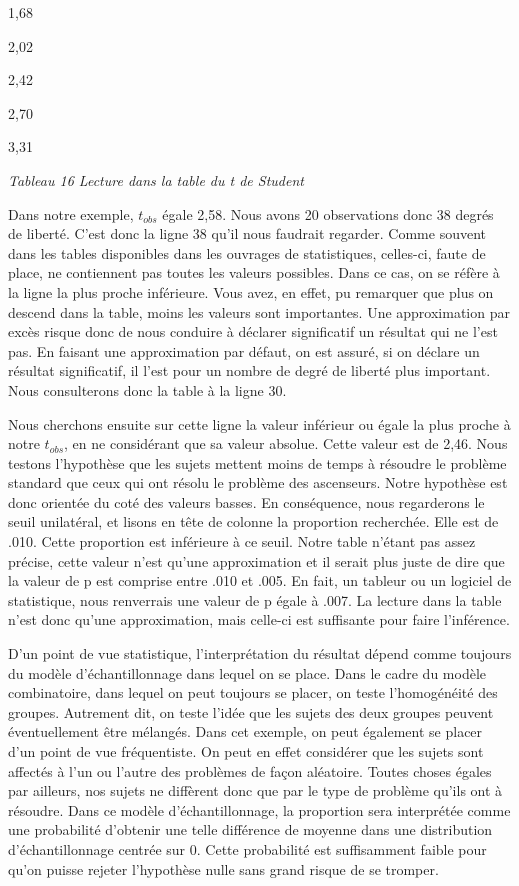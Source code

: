 \documentclass[]{book}
\theoremstyle{definition}
\theoremstyle{definition}
\theoremstyle{definition}
\theoremstyle{remark}
\begin{document}
1,68

2,02

2,42

2,70

3,31

\emph{Tableau 16 Lecture dans la table du t de Student}

Dans notre exemple, \(t_{obs}\) égale 2,58. Nous avons 20 observations
donc 38 degrés de liberté. C'est donc la ligne 38 qu'il nous faudrait
regarder. Comme souvent dans les tables disponibles dans les ouvrages de
statistiques, celles-ci, faute de place, ne contiennent pas toutes les
valeurs possibles. Dans ce cas, on se réfère à la ligne la plus proche
inférieure. Vous avez, en effet, pu remarquer que plus on descend dans
la table, moins les valeurs sont importantes. Une approximation par
excès risque donc de nous conduire à déclarer significatif un résultat
qui ne l'est pas. En faisant une approximation par défaut, on est
assuré, si on déclare un résultat significatif, il l'est pour un nombre
de degré de liberté plus important. Nous consulterons donc la table à la
ligne 30.

Nous cherchons ensuite sur cette ligne la valeur inférieur ou égale la
plus proche à notre \(t_{obs}\), en ne considérant que sa valeur
absolue. Cette valeur est de 2,46. Nous testons l'hypothèse que les
sujets mettent moins de temps à résoudre le problème standard que ceux
qui ont résolu le problème des ascenseurs. Notre hypothèse est donc
orientée du coté des valeurs basses. En conséquence, nous regarderons le
seuil unilatéral, et lisons en tête de colonne la proportion recherchée.
Elle est de .010. Cette proportion est inférieure à ce seuil. Notre
table n'étant pas assez précise, cette valeur n'est qu'une approximation
et il serait plus juste de dire que la valeur de p est comprise entre
.010 et .005. En fait, un tableur ou un logiciel de statistique, nous
renverrais une valeur de p égale à .007. La lecture dans la table n'est
donc qu'une approximation, mais celle-ci est suffisante pour faire
l'inférence.

D'un point de vue statistique, l'interprétation du résultat dépend comme
toujours du modèle d'échantillonnage dans lequel on se place. Dans le
cadre du modèle combinatoire, dans lequel on peut toujours se placer, on
teste l'homogénéité des groupes. Autrement dit, on teste l'idée que les
sujets des deux groupes peuvent éventuellement être mélangés. Dans cet
exemple, on peut également se placer d'un point de vue fréquentiste. On
peut en effet considérer que les sujets sont affectés à l'un ou l'autre
des problèmes de façon aléatoire. Toutes choses égales par ailleurs, nos
sujets ne diffèrent donc que par le type de problème qu'ils ont à
résoudre. Dans ce modèle d'échantillonnage, la proportion sera
interprétée comme une probabilité d'obtenir une telle différence de
moyenne dans une distribution d'échantillonnage centrée sur 0. Cette
probabilité est suffisamment faible pour qu'on puisse rejeter
l'hypothèse nulle sans grand risque de se tromper.
\end{document}
